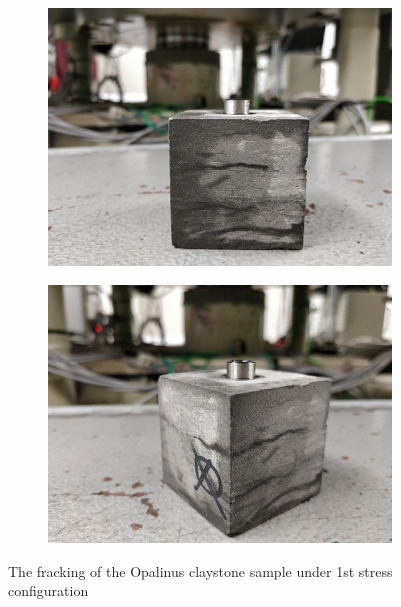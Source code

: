 \begin{figure}[!ht]
\begin{subfigure}[c]{0.48\textwidth}
\includegraphics[width=1\textwidth]{figures/Amir_Percolation_Frack1a.png}
\subcaption{}
\label{fig:Amir_Percolation_Frack1a}
\end{subfigure}
\hfill
\begin{subfigure}[c]{0.48\textwidth}
\includegraphics[width=1\textwidth]{figures/Amir_Percolation_Frack1b.png}
\subcaption{}
\label{fig:Amir_Percolation_Frack1b}
\end{subfigure}
\caption{The fracking of the Opalinus claystone sample under 1st stress configuration}
\end{figure}


